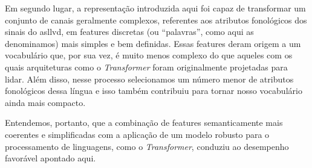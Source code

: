 Em segundo lugar, a representação introduzida aqui foi capaz de transformar um conjunto de canais geralmente complexos, referentes aos atributos fonológicos dos sinais do \acrfull{asllvd}, em features discretas (ou ``palavras'', como aqui as denominamos) mais simples e bem definidas. Essas features deram origem a um vocabulário que, por sua vez, é muito menos complexo do que aqueles com os quais arquiteturas como o \textit{Transformer} foram originalmente projetadas para lidar. Além disso, nesse processo selecionamos um número menor de atributos fonológicos dessa língua e isso também contribuiu para tornar nosso vocabulário ainda mais compacto.

Entendemos, portanto, que a combinação de features semanticamente mais coerentes e simplificadas com a aplicação de um modelo robusto para o processamento de linguagens, como o \textit{Transformer}, conduziu ao desempenho favorável apontado aqui.















